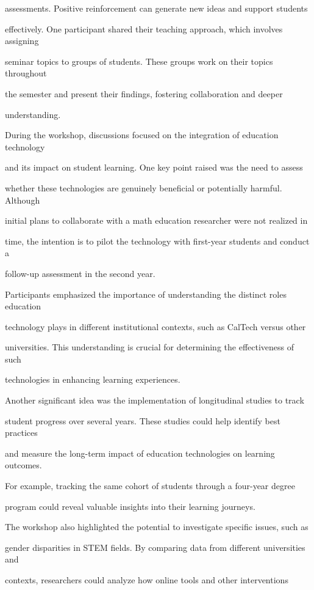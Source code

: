 \documentclass[11pt]{article}
\begin{document}
assessments. Positive reinforcement can generate new ideas and support students

effectively. One participant shared their teaching approach, which involves assigning

seminar topics to groups of students. These groups work on their topics throughout

the semester and present their findings, fostering collaboration and deeper

understanding.

During the workshop, discussions focused on the integration of education technology

and its impact on student learning. One key point raised was the need to assess

whether these technologies are genuinely beneficial or potentially harmful. Although

initial plans to collaborate with a math education researcher were not realized in

time, the intention is to pilot the technology with first-year students and conduct a

follow-up assessment in the second year.

Participants emphasized the importance of understanding the distinct roles education

technology plays in different institutional contexts, such as CalTech versus other

universities. This understanding is crucial for determining the effectiveness of such

technologies in enhancing learning experiences.

Another significant idea was the implementation of longitudinal studies to track

student progress over several years. These studies could help identify best practices

and measure the long-term impact of education technologies on learning outcomes.

For example, tracking the same cohort of students through a four-year degree

program could reveal valuable insights into their learning journeys.

The workshop also highlighted the potential to investigate specific issues, such as

gender disparities in STEM fields. By comparing data from different universities and

contexts, researchers could analyze how online tools and other interventions
\end{document}
